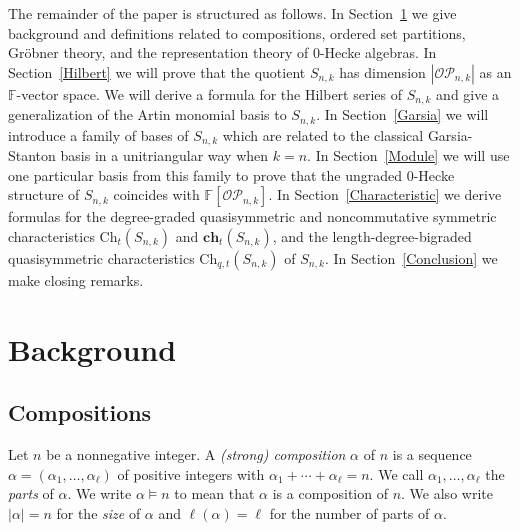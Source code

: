 \documentclass[ALCO,ThmDefs,published]{cedram}
\newcommand{\FF}{{\mathbb{F}}}
\theoremstyle{plain}
\newcommand{\Ch}{{\mathrm {Ch}}}
\newcommand{\ch}{{\mathbf {ch}}}
\newcommand{\OP}{{\mathcal{OP}}}
\newcommand{\FF}{{\mathbb{F}}}
\begin{document}
The remainder of the paper is structured as follows.
In {Section~\ref{Background}} we give background and definitions related to compositions,
ordered set partitions, Gr\"obner theory, and the representation theory of 0-Hecke algebras.
In {Section~\ref{Hilbert}} we will prove that the quotient $S_{n,k}$ has dimension $|\OP_{n,k}|$
as an $\FF$-vector space.  We will derive a formula for the Hilbert series of $S_{n,k}$ and 
give a generalization of the Artin monomial basis to $S_{n,k}$.
In {Section~\ref{Garsia}} we will introduce a  family of bases of $S_{n,k}$ which are related
to the classical Garsia-Stanton basis in a unitriangular way when $k = n$.  
In {Section~\ref{Module}} we will use one particular basis from this family to prove that 
the ungraded 0-Hecke structure of $S_{n,k}$ coincides with $\FF[\OP_{n,k}]$.
In {Section~\ref{Characteristic}}
we  derive formulas for the degree-graded quasisymmetric and noncommutative symmetric characteristics
$\Ch_t(S_{n,k})$ and $\ch_t(S_{n,k})$, and the length-degree-bigraded quasisymmetric characteristics $\Ch_{q,t}(S_{n,k})$ of $S_{n,k}$.
In {Section~\ref{Conclusion}} we make closing remarks.









\section{Background}
\label{Background}


\subsection{Compositions}
Let $n$ be a nonnegative integer.
A \emph{(strong) composition} $\alpha$ of $n$ is a sequence
$\alpha = (\alpha_1, \dots, \alpha_{\ell})$ of positive integers with $\alpha_1 + \cdots + \alpha_{\ell} = n$.
We call $\alpha_1,\ldots,\alpha_\ell$ the \emph{parts} of $\alpha$.
We write $\alpha \models n$ to mean that $\alpha$ is a  composition of $n$.
We also write $|\alpha| = n$ for the \emph{size} of $\alpha$ and $\ell(\alpha) = \ell$ for the number  of parts of $\alpha$.
\end{document}
